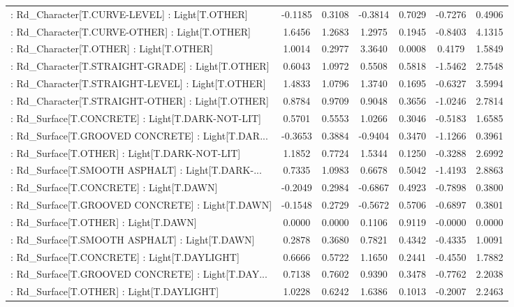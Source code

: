 \begin{longtable}{p{4cm}cccccc}
 : Rd\_Character[T.CURVE-LEVEL] : Light[T.OTHER]    & -0.1185 &    0.3108 & -0.3814 &       0.7029 & -0.7276 &  0.4906 \\
 : Rd\_Character[T.CURVE-OTHER] : Light[T.OTHER]    &  1.6456 &    1.2683 &  1.2975 &       0.1945 & -0.8403 &  4.1315 \\
 : Rd\_Character[T.OTHER] : Light[T.OTHER]          &  1.0014 &    0.2977 &  3.3640 &       0.0008 &  0.4179 &  1.5849 \\
 : Rd\_Character[T.STRAIGHT-GRADE] : Light[T.OTHER] &  0.6043 &    1.0972 &  0.5508 &       0.5818 & -1.5462 &  2.7548 \\
 : Rd\_Character[T.STRAIGHT-LEVEL] : Light[T.OTHER] &  1.4833 &    1.0796 &  1.3740 &       0.1695 & -0.6327 &  3.5994 \\
 : Rd\_Character[T.STRAIGHT-OTHER] : Light[T.OTHER] &  0.8784 &    0.9709 &  0.9048 &       0.3656 & -1.0246 &  2.7814 \\
 : Rd\_Surface[T.CONCRETE] : Light[T.DARK-NOT-LIT]  &  0.5701 &    0.5553 &  1.0266 &       0.3046 & -0.5183 &  1.6585 \\
 : Rd\_Surface[T.GROOVED CONCRETE] : Light[T.DAR... & -0.3653 &    0.3884 & -0.9404 &       0.3470 & -1.1266 &  0.3961 \\
 : Rd\_Surface[T.OTHER] : Light[T.DARK-NOT-LIT]     &  1.1852 &    0.7724 &  1.5344 &       0.1250 & -0.3288 &  2.6992 \\
 : Rd\_Surface[T.SMOOTH ASPHALT] : Light[T.DARK-... &  0.7335 &    1.0983 &  0.6678 &       0.5042 & -1.4193 &  2.8863 \\
 : Rd\_Surface[T.CONCRETE] : Light[T.DAWN]          & -0.2049 &    0.2984 & -0.6867 &       0.4923 & -0.7898 &  0.3800 \\
 : Rd\_Surface[T.GROOVED CONCRETE] : Light[T.DAWN]  & -0.1548 &    0.2729 & -0.5672 &       0.5706 & -0.6897 &  0.3801 \\
 : Rd\_Surface[T.OTHER] : Light[T.DAWN]             &  0.0000 &    0.0000 &  0.1106 &       0.9119 & -0.0000 &  0.0000 \\
 : Rd\_Surface[T.SMOOTH ASPHALT] : Light[T.DAWN]    &  0.2878 &    0.3680 &  0.7821 &       0.4342 & -0.4335 &  1.0091 \\
 : Rd\_Surface[T.CONCRETE] : Light[T.DAYLIGHT]      &  0.6666 &    0.5722 &  1.1650 &       0.2441 & -0.4550 &  1.7882 \\
 : Rd\_Surface[T.GROOVED CONCRETE] : Light[T.DAY... &  0.7138 &    0.7602 &  0.9390 &       0.3478 & -0.7762 &  2.2038 \\
 : Rd\_Surface[T.OTHER] : Light[T.DAYLIGHT]         &  1.0228 &    0.6242 &  1.6386 &       0.1013 & -0.2007 &  2.2463 \\

\end{longtable}
